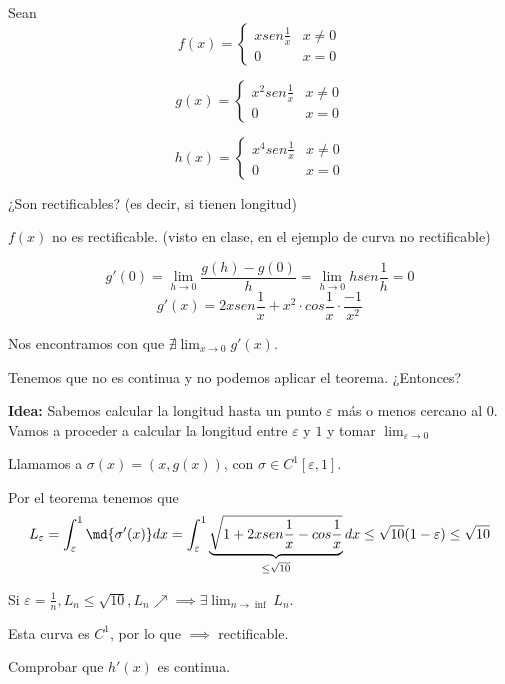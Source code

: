 



\begin{problem}[3]
Sean
\ppart
\[f(x) = \left\{\begin{array}{cc}
x sen\frac{1}{x} & x\neq 0\\
0 & x=0 \end{array}\right.\]

\ppart
\[g(x) = \left\{\begin{array}{cc}
x^2 sen\frac{1}{x} & x\neq 0\\
0 & x=0 \end{array}\right.\]

\ppart
\[h(x) = \left\{\begin{array}{cc}
x^4 sen\frac{1}{x} & x\neq 0\\
0 & x=0 \end{array}\right.\]

¿Son rectificables? (es decir, si tienen longitud)
\solution

\spart $f(x)$ no es rectificable. (visto en clase, en el ejemplo de curva no rectificable)

\spart 
\[g'(0) = \lim_{h\to 0} \frac{g(h)-g(0)}{h} = \lim_{h\to 0} h sen\frac{1}{h} = 0\]
\[g'(x) = 2xsen\frac{1}{x} + x^2\cdot cos\frac{1}{x}\cdot\frac{-1}{x^2}\]

Nos encontramos con que $\nexists \lim_{x\to 0} g'(x)$. 

Tenemos que no es continua y no podemos aplicar el teorema. ¿Entonces?

\textbf{Idea:} Sabemos calcular la longitud hasta un punto $\varepsilon$ más o menos cercano al $0$. Vamos a proceder a calcular la longitud entre $\varepsilon$ y $1$ y tomar $\lim_{\varepsilon \to 0}$

Llamamos a $\sigma(x) = (x,g(x))$, con $\sigma \in C^1[\varepsilon,1]$.

Por el teorema tenemos que \[L_{\varepsilon} = \int_{\varepsilon}^1 \md{\sigma'(x)}dx = \int_{\varepsilon}^1 \underbrace{\sqrt{1+2xsen\frac{1}{x} - cos\frac{1}{x}}}_{\leq \sqrt{10}}dx \leq \sqrt{10}(1-\varepsilon) \leq \sqrt{10}\]

Si $\varepsilon = \frac{1}{n}, L_n \leq \sqrt{10}, L_n \nearrow \implies \exists \lim_{n\to\inf} L_n$.




\spart Esta curva es $C^1$, por lo que $\implies$ rectificable.

Comprobar que $h'(x)$ es continua.

\end{problem}


